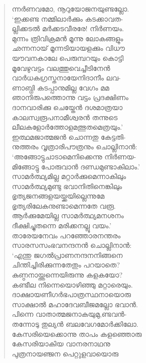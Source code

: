 \begin{verse}
ന്നര്‍ണവമോ, നൂറുയോജനയുണ്ടല്ലോ.\\
‘ഇക്കണ്ട നമ്മിലാര്‍ക്കും കടക്കാവത-\\
ല്ലിക്കടല്‍ മര്‍ക്കടവീരരേ! നിര്‍ണയം.\\
മുന്നം ത്രിവിക്രമന്‍ മൂന്നു ലോകങ്ങളും\\
ഛന്നനായ് മൂന്നടിയായളക്കും വിധൗ\\
യൗവനകാലേ പെരുമ്പറയും കൊട്ടി\\
മൂവേഴുവട്ടം വലത്തുവെച്ചീടിനേന്‍\\
വാര്‍ധകഗ്രസ്തനായേനിദാനീം ലവ-\\
ണാബ്ധി കടപ്പാനുമില്ല വേഗം മമ\\
ഞാനിരുപത്തൊന്നു വട്ടം പ്രദക്ഷിണം\\
ദാനവാരിക്കു ചെയ്തേന്‍ ദശമാത്രയാ\\
കാലസ്വരൂപനാമീശ്വരന്‍ തന്നുടെ\\
ലീലകളോര്‍ത്തോളമത്ഭുതമെത്രയും.’\\
ഇത്ഥമജാത്മജന്‍ ചൊന്നതു കേട്ടതി-\\
നുത്തരം വൃത്രാരിപൗത്രനും ചൊല്ലിനാന്‍:\\
‘അങ്ങോ‌ട്ടുചാടാമെനിക്കെന്നു നിര്‍ണയ-\\
മിങ്ങോട്ടു പോരുവാന്‍ ദണ്ഡമുണ്ടാകിലാം.’\\
സാമര്‍ത്ഥ്യമില്ല മറ്റാര്‍ക്കുമെന്നാകിലും\\
സാമര്‍ത്ഥ്യമുണ്ടു ഭവാനിതിനെങ്കിലും\\
ഭൃത്യജനങ്ങളയയ്ക്കയില്ലെന്നുമേ\\
ഭൃത്യരിലേകനുണ്ടാമെന്നതേ വരൂ.\\
ആര്‍ക്കുമേയില്ല സാമര്‍ത്ഥ്യമനശനം\\
ദീക്ഷിച്ചുതന്നെ മരിക്കനല്ലൂ വയം.’\\
താരേയനേവം പറഞ്ഞോരനന്തരം\\
സാരസസംഭവനന്ദനന്‍ ചൊല്ലിനാന്‍:\\
‘എന്തു ജഗല്‍പ്രാണനന്ദനനിങ്ങനെ\\
ചിന്തിച്ചിരിക്കുന്നതേതും പറയാതെ?\\
കുണ്ഠനായ്ത്തന്നെയിരുന്നു കളകയോ?\\
കണ്ടീല നിന്നെയൊഴിഞ്ഞു മറ്റാരെയും.\\
ദാക്ഷായണീഗര്‍ഭപാത്രസ്ഥനായൊരു\\
സാക്ഷാല്‍ മഹാദേവബീജമല്ലോ ഭവാന്‍.\\
പിന്നെ വാതാത്മജനാകയുമു,ണ്ടവന്‍-\\
തന്നോടു തുല്യന്‍ ബലവേഗമോര്‍ക്കിലോ.\\
കേസരിയെക്കൊന്നു താപം കളഞ്ഞൊരു\\
കേസരിയാകിയ വാനരനാഥനു\\
പുത്രനായഞ്ജന പെറ്റുളവായൊരു\\

\end{verse}
